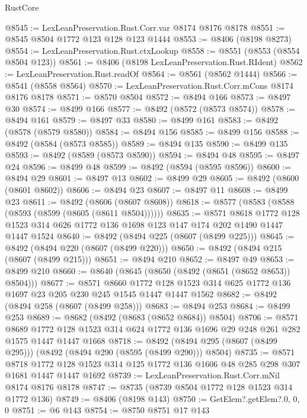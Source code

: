 \begin{lexlean}{RustCore}
\begin{coremodule}
@8545 := LexLeanPreservation.Rust.Corr.var @8174 @8176 @8178
@8551 := @8545 @8504 @1772 @123 @128 @123 @1444
@8553 := @8406 (@8198 @8273)
@8554 := LexLeanPreservation.Rust.ctxLookup
@8558 := @8551 (@8553 (@8554 @8504 @123))
@8561 := @8406 (@8198 LexLeanPreservation.Rust.RIdent)
@8562 := LexLeanPreservation.Rust.readOf
@8564 := @8561 (@8562 @1444)
@8566 := @8541 (@8558 @8564)
@8570 := LexLeanPreservation.Rust.Corr.mCons @8174 @8176 @8178
@8571 := @8570 @8504
@8572 := @8494 @166
@8573 := @8497 @30
@8574 := @8499 @166
@8577 := @8492 (@8572 (@8573 @8574))
@8578 := @8494 @161
@8579 := @8497 @33
@8580 := @8499 @161
@8583 := @8492 (@8578 (@8579 @8580))
@8584 := @8494 @156
@8585 := @8499 @156
@8588 := @8492 (@8584 (@8573 @8585))
@8589 := @8494 @135
@8590 := @8499 @135
@8593 := @8492 (@8589 (@8573 @8590))
@8594 := @8494 @48
@8595 := @8497 @24
@8596 := @8499 @48
@8599 := @8492 (@8594 (@8595 @8596))
@8600 := @8494 @29
@8601 := @8497 @13
@8602 := @8499 @29
@8605 := @8492 (@8600 (@8601 @8602))
@8606 := @8494 @23
@8607 := @8497 @11
@8608 := @8499 @23
@8611 := @8492 (@8606 (@8607 @8608))
@8618 := @8577 (@8583 (@8588 (@8593 (@8599 (@8605 (@8611 @8504))))))
@8635 := @8571
    @8618
    @1772
    @128
    @1523
    @314
    @626
    @1772
    @136
    @1698
    @123
    @147
    @174
    @202
    @1490
    @1447
    @1447
    @1524
@8640 := @8492 (@8494 @225 (@8607 (@8499 @225)))
@8645 := @8492 (@8494 @220 (@8607 (@8499 @220)))
@8650 := @8492 (@8494 @215 (@8607 (@8499 @215)))
@8651 := @8494 @210
@8652 := @8497 @49
@8653 := @8499 @210
@8660 := @8640 (@8645 (@8650 (@8492 (@8651 (@8652 @8653)) @8504)))
@8677 := @8571
    @8660
    @1772
    @128
    @1523
    @314
    @625
    @1772
    @136
    @1697
    @23
    @205
    @230
    @245
    @1545
    @1447
    @1447
    @1562
@8682 := @8492 (@8494 @258 (@8607 (@8499 @258)))
@8683 := @8494 @253
@8684 := @8499 @253
@8689 := @8682 (@8492 (@8683 (@8652 @8684)) @8504)
@8706 := @8571
    @8689
    @1772
    @128
    @1523
    @314
    @624
    @1772
    @136
    @1696
    @29
    @248
    @261
    @282
    @1575
    @1447
    @1447
    @1668
@8718 := @8492 (@8494 @295 (@8607 (@8499 @295))) (@8492 (@8494 @290 (@8595 (@8499 @290))) @8504)
@8735 := @8571
    @8718
    @1772
    @128
    @1523
    @314
    @125
    @1772
    @136
    @1606
    @48
    @285
    @298
    @307
    @1681
    @1447
    @1447
    @1692
@8739 := LexLeanPreservation.Rust.Corr.mNil @8174 @8176 @8178
@8747 := @8735 (@8739 @8504 @1772 @128 @1523 @314 @1772 @136)
@8749 := @8406 (@8198 @143)
@8750 := GetElem?.getElem?.{0, 0, 0}
@8751 := @6 @143
@8754 := @8750 @8751 @17 @143

\end{coremodule}
\end{lexlean}
